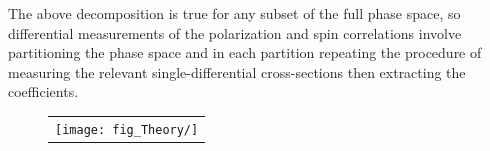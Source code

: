 The above decomposition is true for any subset of the full phase space, so differential measurements of the polarization and spin correlations involve partitioning the phase space and in each partition repeating the procedure of measuring the relevant single-differential cross-sections then extracting the coefficients.

\begin{figure}[!h]
  \begin{center}
    \begin{tabular}{c}
        \texttt{[image: fig\_Theory/]}
    \end{tabular}
    \caption{
            }
    \label{}
  \end{center}
\end{figure}





